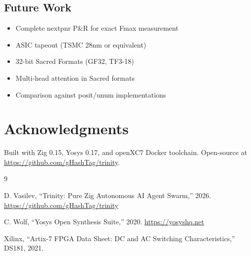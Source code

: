 \documentclass[10pt,conference]{IEEEtran}
\begin{document}
\subsection{Future Work}

\begin{itemize}
  \item Complete nextpnr P\&R for exact Fmax measurement
  \item ASIC tapeout (TSMC 28nm or equivalent)
  \item 32-bit Sacred Formats (GF32, TF3-18)
  \item Multi-head attention in Sacred formats
  \item Comparison against posit/unum implementations
\end{itemize}


\section*{Acknowledgments}

Built with Zig 0.15, Yosys 0.17, and openXC7 Docker toolchain. Open-source at \url{https://github.com/gHashTag/trinity}.


\begin{thebibliography}{9}

D. Vasilev, ``Trinity: Pure Zig Autonomous AI Agent Swarm,'' 2026. \url{https://github.com/gHashTag/trinity}

C. Wolf, ``Yosys Open Synthesis Suite,'' 2020. \url{https://yosyshq.net}

Xilinx, ``Artix-7 FPGA Data Sheet: DC and AC Switching Characteristics,'' DS181, 2021.

\end{thebibliography}
\end{document}
